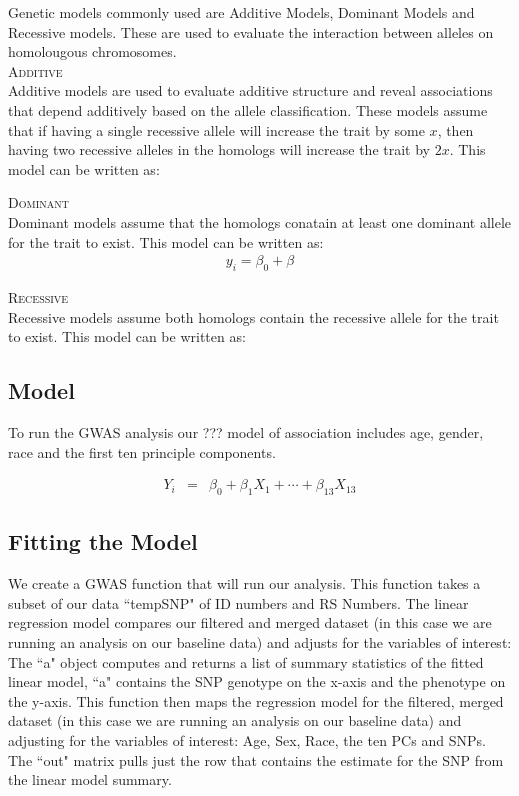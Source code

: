 \documentclass{ar2e}
\begin{document}
Genetic models commonly used are Additive Models, Dominant Models and Recessive models. These are used to evaluate the interaction between alleles on homolougous chromosomes. \\

\textsc{Additive}\\
Additive models are used to evaluate additive structure and reveal associations that depend additively based on the allele classification. These models assume that if having a single recessive allele will increase the trait by some $x$, then having two recessive alleles in the homologs will increase the trait by $2x$. This model can be written as:

\textsc{Dominant}\\
Dominant models assume that the homologs conatain at least one dominant allele for the trait to exist. This model can be written as:
\begin{eqnarray}
y_{i} = \beta_0 + \beta
\end{eqnarray}

\textsc{Recessive}\\
Recessive models assume both homologs contain the recessive allele for the trait to exist. This model can be written as:

\subsection{Model}

To run the GWAS analysis our ??? model of association includes age, gender, race and the first ten principle components.

\begin{eqnarray}
Y_i &=& \beta_0 + \beta_1 X_1 + \cdots + \beta_{13} X_{13}
\end{eqnarray}

\subsection{Fitting the Model}

We create a GWAS function that will run our analysis. This function takes a subset of our data ``tempSNP" of ID numbers and RS Numbers. The linear regression model compares our filtered and merged dataset (in this case we are running an analysis on our baseline data) and adjusts for the variables of interest: 
The ``a" object computes and returns a list of summary statistics of the fitted linear model, ``a" contains the SNP genotype on the x-axis and the phenotype on the y-axis. This function then maps the regression model for the filtered, merged dataset (in this case we are running an analysis on our baseline data) and adjusting for the variables of interest: Age, Sex, Race, the ten PCs and SNPs. The ``out" matrix pulls just the row that contains the estimate for the SNP from the linear model summary.
\end{document}
